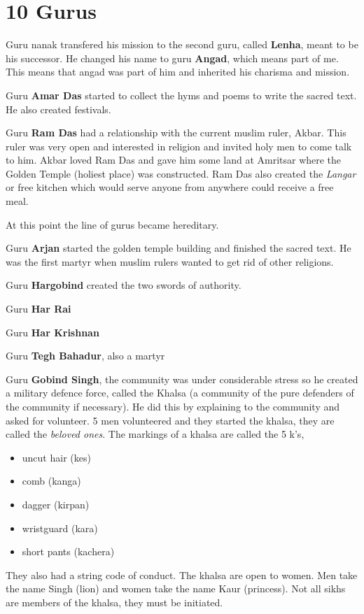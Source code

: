 \documentclass{article}
\begin{document}
\section*{10 Gurus}
\label{sec:10_gurus}
Guru nanak transfered his mission to the second guru, called \textbf{Lenha}, meant to be his successor. He changed his name to guru \textbf{Angad}, which means part of me. This means that angad was part of him and inherited his charisma and mission.

Guru \textbf{Amar Das} started to collect the hyms and poems to write the sacred text. He also created festivals.

Guru \textbf{Ram Das} had a relationship with the current muslim ruler, Akbar. This ruler was very open and interested in religion and invited holy men to come talk to him. Akbar loved Ram Das and gave him some land at Amritsar where the Golden Temple (holiest place) was constructed. Ram Das also created the \emph{Langar} or free kitchen which would serve anyone from anywhere could receive a free meal.

At this point the line of gurus became hereditary.

Guru \textbf{Arjan} started the golden temple building and finished the sacred text. He was the first martyr when muslim rulers wanted to get rid of other religions.

Guru \textbf{Hargobind} created the two swords of authority.

Guru \textbf{Har Rai}

Guru \textbf{Har Krishnan}

Guru \textbf{Tegh Bahadur}, also a martyr

Guru \textbf{Gobind Singh}, the community was under considerable stress so he created a military defence force, called the Khalsa (a community of the pure defenders of the community if necessary). He did this by explaining to the community and asked for volunteer. 5 men volunteered and they started the khalsa, they are called the \emph{beloved ones}. The markings of a khalsa are called the 5 k's,
\begin{itemize}
	\item uncut hair (kes)
	\item comb (kanga)
	\item dagger (kirpan)
	\item wristguard (kara)
	\item short pants (kachera)
\end{itemize}
They also had a string code of conduct. The khalsa are open to women. Men take the name Singh (lion) and women take the name Kaur (princess). Not all sikhs are members of the khalsa, they must be initiated.
\end{document}
